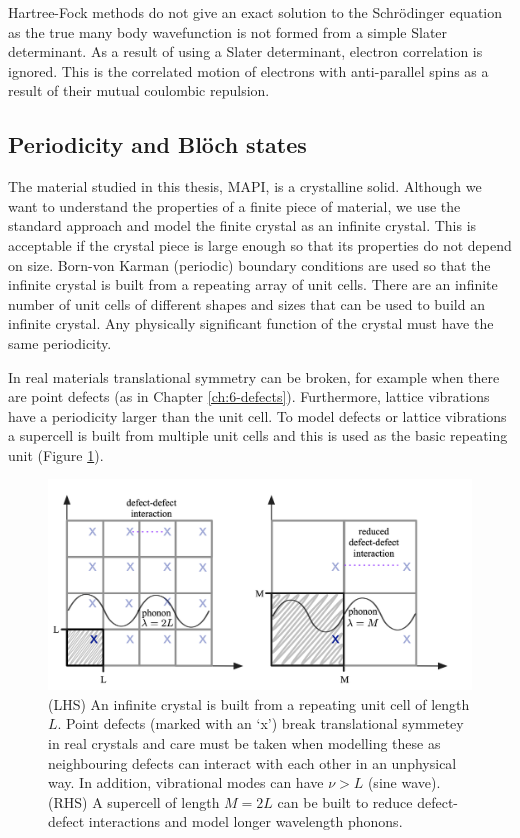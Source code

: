 Hartree-Fock methods do not give an exact solution to the Schr\"{o}dinger equation as the true many body wavefunction is not formed from a simple Slater determinant. As a result of using a Slater determinant, electron correlation is ignored. This is the correlated motion of electrons with anti-parallel spins as a result of their mutual coulombic repulsion.

\subsection{Periodicity and Bl\"{o}ch states}

The material studied in this thesis, MAPI, is a crystalline solid. Although we want to understand the properties of a finite piece of material, we use the standard approach and model the finite crystal as an infinite crystal. This is acceptable if the crystal piece is large enough so that its properties do not depend on size. Born-von Karman (periodic) boundary conditions are used so that the infinite crystal is built from a repeating array of unit cells. There are an infinite number of unit cells of different shapes and sizes that can be used to build an infinite crystal. Any physically significant function of the crystal must have the same periodicity.

In real materials translational symmetry can be broken, for example when there are point defects (as in Chapter \ref{ch:6-defects}). Furthermore, lattice vibrations have a periodicity larger than the unit cell. To model defects or lattice vibrations a supercell is built from multiple unit cells and this is used as the basic repeating unit (Figure \ref{translational}).

\begin{figure}[h]
\centering
  \includegraphics[width=0.8\columnwidth]{figures/ch3/supercell.png}
  \caption[Translational symmetry and supercell construction]{(LHS) An infinite crystal is built from a repeating unit cell of length $L$. Point defects (marked with an `x') break translational symmetey in real crystals and care must be taken when modelling these as neighbouring defects can interact with each other in an unphysical way. In addition, vibrational modes can have $\nu>L$ (sine wave). (RHS) A supercell of length $M=2L$ can be built to reduce defect-defect interactions and model longer wavelength phonons. } 
  \label{translational}
\end{figure}

